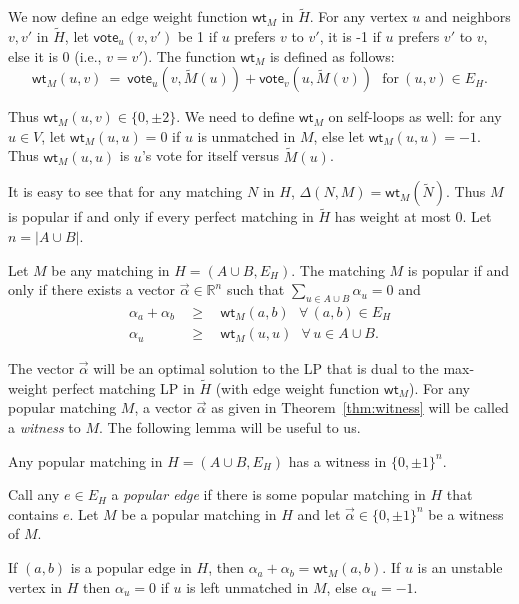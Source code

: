 \documentclass{llncs}
\newcommand{\vote}{\mathsf{vote}}
\newcommand{\wt}{\mathsf{wt}}
\begin{document}
We now define an edge weight function $\wt_M$ in $\tilde{H}$. For any vertex $u$ and neighbors $v, v'$ in $\tilde{H}$, let
$\vote_u(v,v')$ be 1 if $u$ prefers $v$ to $v'$,
it is -1 if $u$ prefers $v'$ to $v$, else it is 0 (i.e., $v = v'$). The function $\wt_M$ is defined as follows:
\[ \wt_M(u,v) \ = \ \vote_u(v,\tilde{M}(u)) + \vote_v(u,\tilde{M}(v)) \ \ \ \mathrm{for}\ (u,v) \in E_H.\]

Thus $\wt_M(u,v) \in \{0, \pm 2\}$.
We need to define $\wt_M$ on self-loops as well: for any $u \in V$, let $\wt_M(u,u) = 0$ if $u$ is unmatched in $M$, else
let $\wt_M(u,u) = -1$. Thus $\wt_M(u,u)$ is $u$'s vote for itself versus $\tilde{M}(u)$.


It is easy to see that for any matching $N$ in $H$, $\Delta(N,M) = \wt_M(\tilde{N})$.
Thus $M$ is popular if and only if every perfect matching in $\tilde{H}$ has weight at most 0. Let $n = |A \cup B|$.


\begin{theorem}
\label{thm:witness}
  Let $M$ be any matching in $H = (A \cup B, E_H)$. The matching $M$ is popular if and only if there exists a vector $\vec{\alpha} \in \mathbb{R}^n$
  such that $\sum_{u \in A \cup B}\alpha_u = 0$ and
  \begin{eqnarray*}
    \alpha_{a} + \alpha_{b} & \ \ \ge \ \ & \wt_{M}(a,b) \ \ \ \forall\, (a,b)\in E_H\\
    \alpha_u & \ \ \ge \ \ & \wt_M(u,u) \ \ \ \forall\, u\in A \cup B.
  \end{eqnarray*}  
\end{theorem}  

The vector $\vec{\alpha}$ will be an optimal solution to the LP that is dual to the max-weight perfect matching LP in $\tilde{H}$
(with edge weight function $\wt_M$). For any popular matching $M$, a vector $\vec{\alpha}$ as given in Theorem~\ref{thm:witness}
will be called a {\em witness} to $M$. The following lemma will be useful to us.

\begin{lemma}
  Any popular matching in $H = (A \cup B, E_H)$ has a witness in $\{0,\pm 1\}^n$.
\end{lemma}


Call any $e \in E_H$ a {\em popular edge} if there is some popular matching in $H$ that contains $e$.
Let $M$ be a popular matching in $H$ and let $\vec{\alpha} \in \{0,\pm 1\}^n$ be a witness of $M$.

\begin{lemma}
\label{prop0}
If $(a,b)$ is a popular edge in $H$, then $\alpha_a + \alpha_b = \wt_M(a,b)$.
If $u$ is an unstable vertex in $H$ then $\alpha_u = 0$ if $u$ is left unmatched in $M$, else $\alpha_u = -1$.
\end{lemma}
\end{document}
